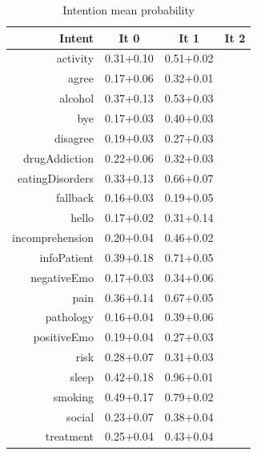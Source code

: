 \documentclass[11pt]{article}
\begin{document}
\begin{table}[htb]
\begin{center}
\begin{tabular}{ |r|c|c|c| }
\hline
Intent & It 0 & It 1 & It 2 \\ \hline
activity		& 0.31+0.10 & 0.51+0.02	\\ \hline
agree 			& 0.17+0.06 & 0.32+0.01	\\ \hline
alcohol 		& 0.37+0.13 & 0.53+0.03	\\ \hline
bye 			& 0.17+0.03 & 0.40+0.03	\\ \hline
disagree 		& 0.19+0.03 & 0.27+0.03	\\ \hline
drugAddiction 	& 0.22+0.06 & 0.32+0.03 \\ \hline
eatingDisorders & 0.33+0.13 & 0.66+0.07 \\ \hline
fallback 		& 0.16+0.03 & 0.19+0.05	\\ \hline
hello 			& 0.17+0.02 & 0.31+0.14	\\ \hline
incomprehension & 0.20+0.04 & 0.46+0.02	\\ \hline
infoPatient 	& 0.39+0.18 & 0.71+0.05 \\ \hline
negativeEmo 	& 0.17+0.03 & 0.34+0.06 \\ \hline
pain 			& 0.36+0.14 & 0.67+0.05 \\ \hline
pathology 		& 0.16+0.04 & 0.39+0.06 \\ \hline
positiveEmo 	& 0.19+0.04 & 0.27+0.03 \\ \hline
risk 			& 0.28+0.07 & 0.31+0.03 \\ \hline
sleep 			& 0.42+0.18 & 0.96+0.01 \\ \hline
smoking 		& 0.49+0.17 & 0.79+0.02 \\ \hline
social 			& 0.23+0.07 & 0.38+0.04 \\ \hline
treatment 		& 0.25+0.04 & 0.43+0.04 \\ \hline
\end{tabular}
\caption{Intention mean probability}
\end{center}
\end{table}
\FloatBarrier
\end{document}
